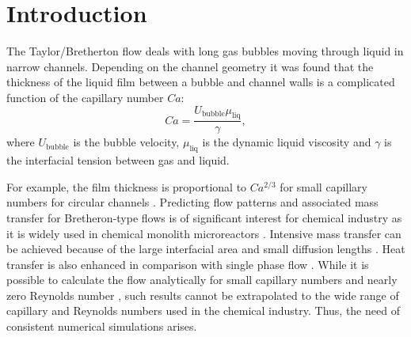 \documentclass[preprint,12pt]{elsarticle}
\begin{document}
\section{Introduction}
The Taylor/Bretherton \cite{bretherton} flow deals with long gas bubbles moving through liquid in
narrow channels. Depending on the channel geometry it was found \cite{gupta-review} that the 
thickness of the liquid film between a bubble and channel walls
is a complicated function of the capillary number $Ca$:
\begin{equation}
\label{capillary:number:definition}
Ca=\frac{U_{\mathrm{bubble}} \mu_{\mathrm{liq}}}{\gamma},
\end{equation}
where $U_{\mathrm{bubble}}$ is the bubble velocity, $\mu_{\mathrm{liq}}$ is the
dynamic liquid viscosity and $\gamma$ is the interfacial tension between gas and liquid. 

For example, the film thickness
is proportional to $Ca^{2/3}$ for small capillary numbers for circular channels
\cite{bretherton,heil-bretherton}. 
Predicting flow patterns and associated mass transfer for Bretheron-type flows
is of significant interest for chemical industry as it is widely used in chemical monolith
microreactors \cite{kreutzer-pressure-drop}. Intensive mass transfer can be achieved because of the
large interfacial area and small diffusion lengths \cite{cerro-bubble-train}. Heat transfer is
also enhanced in comparison with single phase flow \cite{fukugata-levelset}. While it
is possible to calculate the flow analytically for small capillary numbers and nearly zero Reynolds
number \cite{bretherton}, such
results cannot be extrapolated to the wide range of capillary and Reynolds numbers used in the
chemical industry.  Thus, the need of consistent numerical simulations arises.
\end{document}

